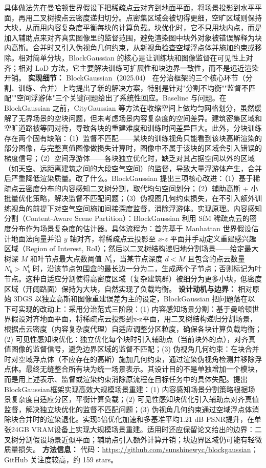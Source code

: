 具体做法先在曼哈顿世界假设下把稀疏点云对齐到地面平面，将场景投影到水平平面，再用二叉树按点云密度递归切分。点密集区域会被切得更细，空旷区域则保持大块，从而用内容复杂度平衡每块的计算负载。块优化时，它不只用块内点，而是加入辅助点来对齐真实图像里的监督范围，避免渲染图中块外对象被错误解释为块内高斯。合并时又引入伪视角几何约束，从新视角检查空域浮点体并施加约束或移除。相对简单分块，BlockGaussian 的核心是让训练块和图像监督在可见性上对齐；相对 LoD 方法，它主要解决训练可扩展性和块边界一致性，而不是远近渲染开销。
\textbf{实现细节：} BlockGaussian（2025.04） 在分治框架的三个核心环节（分割、训练、合并）上均提出了新的解决方案，特别是针对"分割不均衡""监督不匹配""空间浮游体"三个关键问题给出了系统性回应。Baseline 与问题。在 BlockGaussian 之前，CityGaussian 等方法在收缩空间上做均匀网格划分，虽然缓解了无界场景的空块问题，但未考虑场景内容复杂度的空间差异。建筑密集区域和空旷道路被等同对待，导致各块的重建难度和训练时间差异巨大。此外，分块训练存在两个固有缺陷：（1）监督不匹配——某块的训练视角只能看到该块高斯渲染的部分图像，与完整真值图像做损失计算时，图像中不属于该块的区域会引入错误的梯度信号；（2）空间浮游体——各块独立优化时，缺乏对其占据空间以外的区域（如天空、远距离建筑之间的大段空气空间）的监督，导致大量浮游体产生，合并后严重降低渲染质量。改了什么。BlockGaussian 提出三项核心改进：（1）基于稀疏点云密度分布的内容感知二叉树分割，取代均匀空间划分；（2）辅助高斯 + 小批量优化策略，解决监督不匹配问题；（3）伪视图几何约束损失，在不引入额外训练视角的前提下对空气空间施加间接深度监督，消除浮游体。实现原理。内容感知分割（Content-Aware Scene Partition）：BlockGaussian 利用 SfM 稀疏点云的密度分布作为场景复杂度的估计器。具体流程为：首先基于 Manhattan 世界假设估计地面法向量并沿 $y$ 轴对齐，将稀疏点云投影至 $x$-$z$ 平面并手动定义重建感兴趣区域（Region of Interest, RoI）；然后以二叉树结构递归地分割场景——给定最大树深 $M$ 和叶节点最大点数阈值 $N_b^t$，当某节点深度 $d < M$ 且包含的点云数量 $N_b > N_b^t$ 时，沿该节点包围盒的最长边一分为二，生成两个子节点；否则标记为叶节点。这种自适应分割使得高密度区域（复杂建筑群）被细分为更多小块，低密度区域（开阔路面）保持为大块，自然实现了负载均衡。
\textbf{设计动机与边界：} 相对原始 3DGS 以独立高斯和图像重建误差为主的设定，BlockGaussian 把问题落在以下可实现的改动上：采用分治范式三阶段：(1) 内容感知场景分割：基于曼哈顿世界假设对齐地面平面，将稀疏点云投影到x-z平面，用二叉树结构递归分割场景，根据点云密度（内容复杂度代理）自适应调整分区粒度，确保各块计算负载均衡；(2) 可见性感知块优化：独立优化每个块时引入辅助点（当前块外的点），对齐真值图像的监督信号，避免边界区域的监督不匹配；(3) 伪视角几何约束：在块合并时对空域浮点体（不应存在的高斯）施加几何约束，通过渲染伪视角检测并移除浮点体。最终无缝整合所有块为统一场景表示。其设计目的不是单独增加一个模块，而是用上述表示、监督或渲染约束消除原流程在目标任务中的具体失配。提出BlockGaussian框架实现高效大规模场景重建：(1) 内容感知场景分割策略根据场景复杂度自适应分区，平衡计算负载；(2) 可见性感知块优化引入辅助点对齐真值监督，解决独立块优化的监督不匹配问题；(3) 伪视角几何约束通过空域浮点体消除块合并时的渲染退化。实现5倍优化加速和多基准平均1.21 dB PSNR提升，在单张24GB VRAM设备上实现大规模场景重建。适用时还应保留论文给出的边界：二叉树分割假设场景近似平面；辅助点引入额外计算开销；块边界区域仍可能有轻微质量损失。
\textbf{方法信息：} 代码：\url{https://github.com/sunshinewyc/blockgaussian}；GitHub 关注度较高，约 159 stars。



